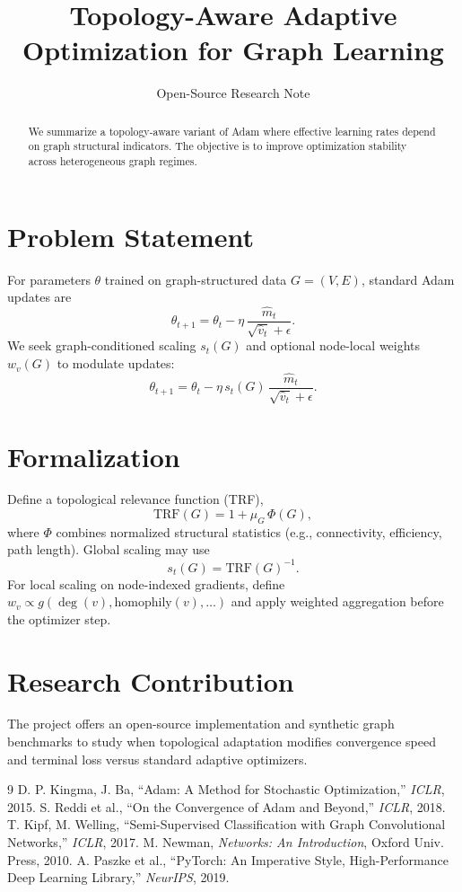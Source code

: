 ﻿\documentclass[11pt,a4paper]{article}
\title{Topology-Aware Adaptive Optimization for Graph Learning}
\author{Open-Source Research Note}
\date{}
\begin{document}
\maketitle

\begin{abstract}
We summarize a topology-aware variant of Adam where effective learning rates depend on graph structural indicators. The objective is to improve optimization stability across heterogeneous graph regimes.
\end{abstract}

\section{Problem Statement}
For parameters $\theta$ trained on graph-structured data $G=(V,E)$, standard Adam updates are
\[
\theta_{t+1}=\theta_t-\eta\,\frac{\hat{m}_t}{\sqrt{\hat{v}_t}+\epsilon}.
\]
We seek graph-conditioned scaling $s_t(G)$ and optional node-local weights $w_v(G)$ to modulate updates:
\[
\theta_{t+1}=\theta_t-\eta\,s_t(G)\,\frac{\hat{m}_t}{\sqrt{\hat{v}_t}+\epsilon}.
\]

\section{Formalization}
Define a topological relevance function (TRF),
\[
\mathrm{TRF}(G)=1+\mu_G\,\Phi(G),
\]
where $\Phi$ combines normalized structural statistics (e.g., connectivity, efficiency, path length). Global scaling may use
\[
s_t(G)=\mathrm{TRF}(G)^{-1}.
\]
For local scaling on node-indexed gradients, define $w_v\propto g(\deg(v),\mathrm{homophily}(v),\ldots)$ and apply weighted aggregation before the optimizer step.

\section{Research Contribution}
The project offers an open-source implementation and synthetic graph benchmarks to study when topological adaptation modifies convergence speed and terminal loss versus standard adaptive optimizers.

\begin{thebibliography}{9}
 D. P. Kingma, J. Ba, ``Adam: A Method for Stochastic Optimization,'' \emph{ICLR}, 2015.
 S. Reddi et al., ``On the Convergence of Adam and Beyond,'' \emph{ICLR}, 2018.
 T. Kipf, M. Welling, ``Semi-Supervised Classification with Graph Convolutional Networks,'' \emph{ICLR}, 2017.
 M. Newman, \emph{Networks: An Introduction}, Oxford Univ. Press, 2010.
 A. Paszke et al., ``PyTorch: An Imperative Style, High-Performance Deep Learning Library,'' \emph{NeurIPS}, 2019.
\end{thebibliography}
\end{document}

